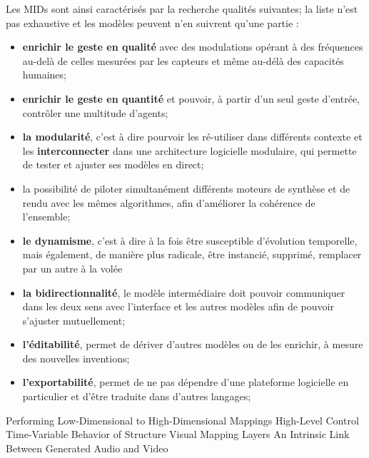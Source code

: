 \noindent Les MIDs sont ainsi caractérisés par la recherche qualités suivantes; la liste n'est pas exhaustive et les modèles peuvent n'en suivrent qu'une partie :
\vspace{-1em}
\begin{itemize}[noitemsep]
	\item \textbf{enrichir le geste en qualité} avec des modulations opérant à des fréquences au-delà de celles mesurées par les capteurs et même au-délà des capacités humaines;
	\item \textbf{enrichir le geste en quantité} et pouvoir, à partir d'un seul geste d'entrée, contrôler une multitude d'agents;
	\item \textbf{la modularité}, c'est à dire pourvoir les ré-utiliser dans différents contexte et les \textbf{interconnecter} dans une architecture logicielle modulaire, qui permette de tester et ajuster ses modèles en direct;
	\item la possibilité de piloter simultanément différents moteurs de synthèse et de rendu avec les mêmes algorithmes, afin d'améliorer la cohérence de l'ensemble;
	\item \textbf{le dynamisme}, c'est à dire à la fois être susceptible d'évolution temporelle, mais également, de manière plus radicale, être instancié, supprimé, remplacer par un autre à la volée
	\item \textbf{la bidirectionnalité}, le modèle intermédiaire doit pouvoir communiquer dans les deux sens avec l'interface et les autres modèles afin de pouvoir s'ajuster mutuellement;
	\item \textbf{l'éditabilité}, permet de dériver d'autres modèles ou de les enrichir, à mesure des nouvelles inventions;
	\item \textbf{l'exportabilité}, permet de ne pas dépendre d'une plateforme logicielle en particulier et d'être traduite dans d'autres langages;
\end{itemize}

Performing Low-Dimensional to High-Dimensional Mappings
High-Level Control
Time-Variable Behavior of Structure
Visual Mapping Layers
An Intrinsic Link Between Generated Audio and Video



